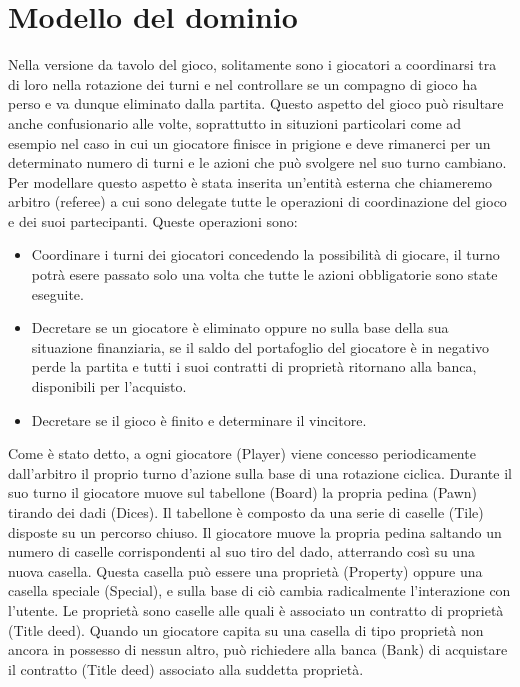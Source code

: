 \section{Modello del dominio}
Nella versione da tavolo del gioco, solitamente sono i giocatori a coordinarsi tra di loro
nella rotazione dei turni e nel controllare se un compagno di gioco ha perso e va dunque eliminato dalla partita.
Questo aspetto del gioco può risultare anche confusionario alle volte, soprattutto in situzioni particolari come ad esempio
nel caso in cui un giocatore finisce in prigione e deve rimanerci per un determinato numero di turni e le azioni che può
svolgere nel suo turno cambiano. 
Per modellare questo aspetto è stata inserita un'entità esterna che chiameremo arbitro (referee) a cui sono delegate
tutte le operazioni di coordinazione del gioco e dei suoi partecipanti. 
Queste operazioni sono:
\begin{itemize}
    \item
    Coordinare i turni dei giocatori concedendo la possibilità di giocare, il turno potrà esere passato solo una volta che tutte le azioni obbligatorie sono state eseguite.
    \item 
    Decretare se un giocatore è eliminato oppure no sulla base della sua situazione finanziaria,
    se il saldo del portafoglio del giocatore è in negativo perde la partita e tutti i suoi contratti di proprietà
    ritornano alla banca, disponibili per l’acquisto. 
    \item
    Decretare se il gioco è finito e determinare il vincitore.
\end{itemize}
Come è stato detto, a ogni giocatore (Player) viene concesso periodicamente dall'arbitro il proprio turno d’azione sulla base di una rotazione ciclica.
Durante il suo turno il giocatore muove sul tabellone (Board) la propria pedina (Pawn) tirando dei dadi (Dices).
Il tabellone è composto da una serie di caselle (Tile) disposte su un percorso chiuso. Il giocatore muove la propria pedina saltando 
un numero di caselle corrispondenti al suo tiro del dado, atterrando così su una nuova casella. 
Questa casella può essere una proprietà (Property) oppure una casella speciale (Special), 
e sulla base di ciò cambia radicalmente l’interazione con l’utente. 
Le proprietà sono caselle alle quali è associato un contratto di proprietà (Title deed). 
Quando un giocatore capita su una casella di tipo proprietà non ancora in possesso di nessun altro, può richiedere alla banca (Bank) di acquistare
il contratto (Title deed) associato alla suddetta proprietà.
